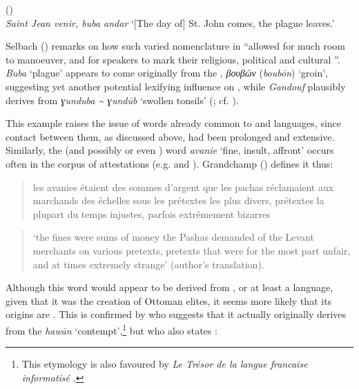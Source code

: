 \documentclass[output=paper]{langsci/langscibook}
\begin{document}
	\ea
	(\citealt{Rehbinder1800})\\
	\textit{Saint Jean venir, buba andar} 
	\glt ‘[The day of] St. John comes, the plague leaves.’ 
	\z
	
	Selbach (\citeyear[44]{Selbach2008}) remarks on how such varied nomenclature in  ``allowed for much room to manoeuver, and for speakers to mark their religious, political and cultural ''. \textit{Buba} ‘plague’ appears to come originally from the , \textit{βουβών} (\textit{boubōn}) ‘groin’, suggesting yet another potential lexifying influence on , while \textit{Gandouf} plausibly derives from  \textit{ɣunduba {\textasciitilde} ɣundūb} ‘swollen tonsils’ (\citealt[72]{Schuchardt1909}; cf. \citealt[45]{Selbach2008}). 
	
	This example raises the issue of words already common to  and  languages, since contact between them, as discussed above, had been prolonged and extensive. Similarly, the  (and possibly  or even ) word \textit{avanie} ‘fine, insult, affront’ occurs often in the corpus of attestations (e.g. \citealt{Pananti1841} and \citealt{Grandchamp1920}). Grandchamp (\citeyear[xiii]{Grandchamp1920}) defines it thus: 
	
	\begin{quote}
		les avanies étaient des sommes d'argent que les pachas réclamaient aux marchands des échelles sous les prétextes les plus divers, prétextes la plupart du temps injustes, parfois extrêmement bizarres
	\end{quote}
	
	\begin{quote}
		‘the fines were sums of money the Pashas demanded of the Levant merchants on various pretexts, pretexts that were for the most part unfair, and at times extremely strange’ (author's translation).
	\end{quote}
	
	Although this word would appear to be derived from , or at least a  language, given that it was the creation of Ottoman elites, it seems more likely that its origins are . This is confirmed by \citet{Pihan1847} who suggests that it actually originally derives from the  \textit{hawān} ‘contempt’,\footnote{This etymology is also favoured by \textit{Le Trésor de la langue francaise informatisé} \citep{Dendien1994}.} but who also states \citep[46]{Pihan1847}:
	
\end{document}
